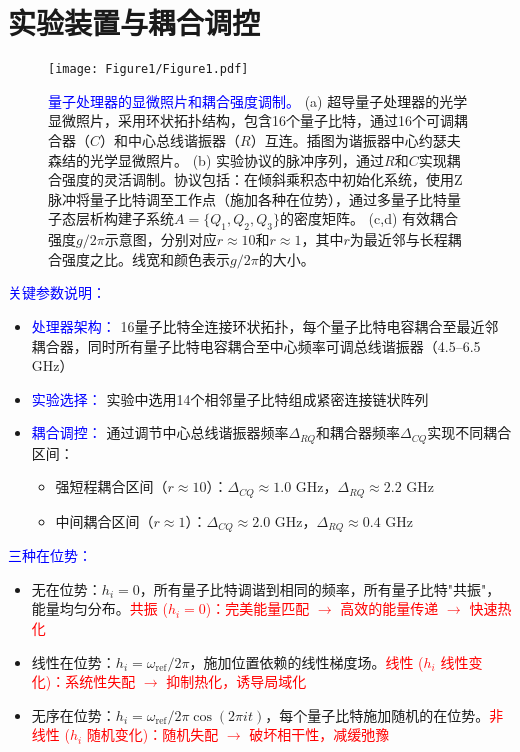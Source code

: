 \documentclass[11pt,a4paper]{article}
\begin{document}
\section{实验装置与耦合调控}

\begin{figure}[H]
    \centering
    \texttt{[image: Figure1/Figure1.pdf]}
    \caption{
        \textcolor{blue}{量子处理器的显微照片和耦合强度调制。}
        (a) 超导量子处理器的光学显微照片，采用环状拓扑结构，包含16个量子比特，通过16个可调耦合器（$C$）和中心总线谐振器（$R$）互连。插图为谐振器中心约瑟夫森结的光学显微照片。
        (b) 实验协议的脉冲序列，通过$R$和$C$实现耦合强度的灵活调制。协议包括：在倾斜乘积态中初始化系统，使用Z脉冲将量子比特调至工作点（施加各种在位势），通过多量子比特量子态层析构建子系统$A=\{Q_1,Q_2,Q_3\}$的密度矩阵。
        (c,d) 有效耦合强度$g/2\pi$示意图，分别对应$r\approx 10$和$r\approx 1$，其中$r$为最近邻与长程耦合强度之比。线宽和颜色表示$g/2\pi$的大小。
    }
    \label{fig:device_and_coupling}
\end{figure}

\textcolor{blue}{关键参数说明：}
\begin{itemize}
    \item \textcolor{blue}{处理器架构：} 16量子比特全连接环状拓扑，每个量子比特电容耦合至最近邻耦合器，同时所有量子比特电容耦合至中心频率可调总线谐振器（4.5–6.5 GHz）
    \item \textcolor{blue}{实验选择：} 实验中选用14个相邻量子比特组成紧密连接链状阵列
    \item \textcolor{blue}{耦合调控：} 通过调节中心总线谐振器频率$\Delta_{RQ}$和耦合器频率$\Delta_{CQ}$实现不同耦合区间：
    \begin{itemize}
        \item 强短程耦合区间（$r\approx 10$）：$\Delta_{CQ}\approx 1.0$ GHz，$\Delta_{RQ}\approx 2.2$ GHz
        \item 中间耦合区间（$r\approx 1$）：$\Delta_{CQ}\approx 2.0$ GHz，$\Delta_{RQ}\approx 0.4$ GHz
    \end{itemize}
\end{itemize}

\textcolor{blue}{三种在位势：}
\begin{itemize}
    \item 无在位势：$h_i = 0$，所有量子比特调谐到相同的频率，所有量子比特"共振"，能量均匀分布。\textcolor{red}{共振 ($h_i=0$)：完美能量匹配 $\rightarrow$ 高效的能量传递 $\rightarrow$ 快速热化}
    \item 线性在位势：$h_i = \omega_{\text{ref}}/2\pi$，施加位置依赖的线性梯度场。\textcolor{red}{线性 ($h_i$ 线性变化)：系统性失配 $\rightarrow$ 抑制热化，诱导局域化}
    \item 无序在位势：$h_i = \omega_{\text{ref}}/2\pi \cos(2\pi i t)$，每个量子比特施加随机的在位势。\textcolor{red}{非线性 ($h_i$ 随机变化)：随机失配 $\rightarrow$ 破坏相干性，减缓弛豫}
\end{itemize}
\end{document}
